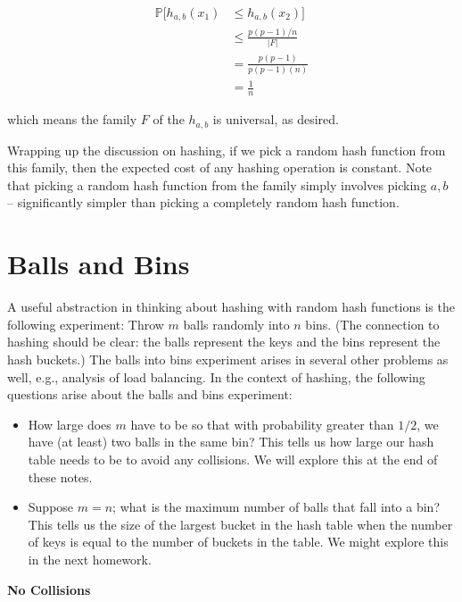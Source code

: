 \documentclass [12pt]{article}
\begin{document}
\begin{align*}
\mathbb{P}[h_{a,b}(x_1) &\leq h_{a,b}(x_2)] \\
&\leq \frac{p(p-1)/n}{|F|} \\
&= \frac{p(p-1)}{p(p-1)(n)} \\
&= \frac{1}{n}
\end{align*}

which means the family $F$ of the $h_{a,b}$ is universal, as desired.

Wrapping up the discussion on hashing, if we pick a random hash function from this family, then the expected cost of any hashing operation is constant. Note that picking a random hash function from the family simply involves picking $a, b$ – significantly simpler than picking a completely random hash function.

\section{Balls and Bins} 

A useful abstraction in thinking about hashing with random hash functions is the following experiment: Throw $m$ balls randomly into $n$ bins. (The connection to hashing should be clear: the balls represent the keys and the bins represent the hash buckets.) The balls into bins experiment arises in several other problems as well, e.g., analysis of load balancing. In the context of hashing, the following questions arise about the balls and bins experiment:

\begin{itemize}
  \item How large does $m$ have to be so that with probability greater than $1/2$, we have (at least) two balls in the same bin? This tells us how large our hash table needs to be to avoid any collisions. We will explore this at the end of these notes.
  \item Suppose $m = n$; what is the maximum number of balls that fall into a bin? This tells us the size of the largest bucket in the hash table when the number of keys is equal to the number of buckets in the table. We might explore this in the next homework.
\end{itemize}

\textbf{No Collisions}
\end{document}

